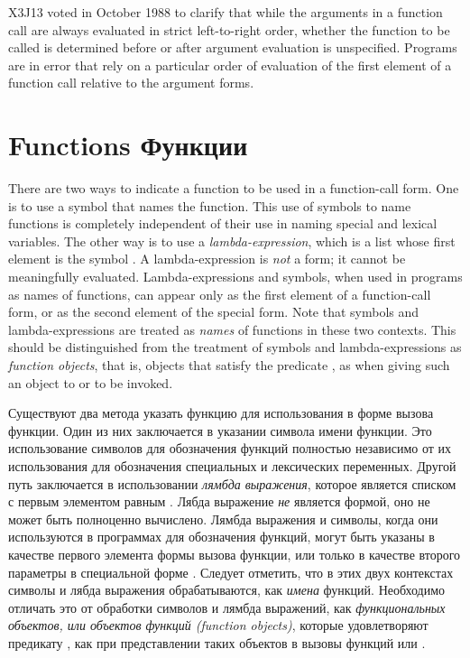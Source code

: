 \begin{newer}
X3J13 voted in October 1988 
to clarify that while the arguments in a function call are always
evaluated in strict left-to-right order, whether the function to
be called is determined before or after argument evaluation
is unspecified.  Programs are in error
that rely on a particular order of evaluation
of the first element of a function call relative to the
argument forms.
\end{newer}

\section{Functions Функции}

There are two ways to indicate a function to be used in a function-call
form.  One is to use a symbol that names the function.  This use of
symbols to name functions is completely independent of their use in
naming special and lexical variables.  The other way is to use a
\textit{lambda-expression}, which is a list whose first element is the symbol
.  A lambda-expression is \textit{not} a form; it cannot be
meaningfully evaluated.  Lambda-expressions and symbols, when used in
programs as names of functions, can appear only as the first element of a
function-call form, or as the second element of the 
special form.  Note that symbols and lambda-expressions are treated as
\textit{names} of functions in these two contexts.  This should be
distinguished from the treatment of symbols and lambda-expressions as
\textit{function objects}, that is,
objects that satisfy the predicate ,
as when giving such an object to  or  to be
invoked.

Существуют два метода указать функцию для использования в форме вызова
функции. Один из них заключается в указании символа имени функции. Это
использование символов для обозначения функций полностью независимо от их
использования для обозначения специальных и лексических переменных. Другой путь
заключается в использовании \textit{лямбда выражения}, которое является списком
с первым элементом равным . Лябда выражение \textit{не} является
формой, оно не может быть полноценно вычислено. Лямбда выражения и символы,
когда они используются в программах для обозначения функций, могут быть
указаны в качестве первого элемента формы вызова функции, или только в качестве
второго параметры в специальной форме . Следует отметить, что
в этих двух контекстах символы и лябда выражения обрабатываются, как
\textit{имена} функций. Необходимо отличать это от обработки символов и лямбда
выражений, как \textit{функциональных объектов, или объектов функций (function
  objects)}, которые удовлетворяют предикату , как при
представлении таких объектов в вызовы функций  или .

